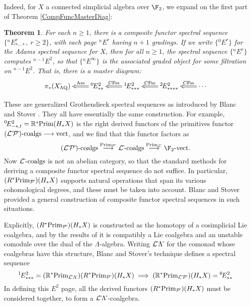 \documentclass[11pt]{article}
\theoremstyle{plain}
\newtheorem{theorem}{Theorem}
\renewcommand*{\thetheorem}{\Alph{theorem}}
\begin{document}
Indeed, for $X$ a connected simplicial algebra over $\F_2$, we expand on the first part of Theorem \ref{CompFuncMasterDiag}:
{
\renewcommand{\thetheorem}{\ref{CompFuncMasterDiag}.A}
\begin{theorem}
For each $n\geq1$, there is a composite functor spectral sequence $\{{^{n\!}}E^r_{*\cdots *},\ r\geq2\}$, with each page ${^{n\!}}E^r$ having $n+1$ gradings. If we write $\{{^{0\!}}E^r\}$ for the Adams spectral sequence for $X$, then for all $n\geq1$, the spectral sequence $\{{^{n\!}}E^r\}$ computes ${^{n-1\!}}E^2$, so that $\{{^{n\!}}E^\infty\}$ is the associated graded object for some filtration on ${^{n-1\!}}E^2$. That is, there is a master diagram:
\[\xymatrix@R=4mm{
\pi_{*}(X{\hat{\,}_\textup{\!\!AQ}})&%
\ar@{=>}[l]_-{\textup{Ass}}
{^{0\!}}E^2_{**}&%
\ar@{=>}[l]_-{\textup{CFss}}
{^{1\!}}E^2_{***}
&%
{^{2\!}}E^2_{****}
\ar@{=>}[l]_-{\textup{CFss}}&%
\cdots
\ar@{=>}[l]_-{\textup{CFss}}%
}\]
\end{theorem}
}
\noindent These are generalized Grothendieck spectral sequences as introduced by Blanc and Stover \cite{Blanc_Stover-Groth_SS.pdf}. They all have essentially the same construction. For example, ${^{0\!}}E^2_{-s,t}=\mathbb{R}^s\textup{Prim}(H_*X)$ is the right derived functors of the primitives functor $(\mathcal{L}{\hat{\,}}\mathcal{P}{\hat{\,}})\textup{-coalgs}\longrightarrow \textup{vect}$, and we find that this functor factors as
\[(\calL{\hat{\,}}\calP{\hat{\,}})\textup{-coalgs}\overset{\textup{Prim}_{\calP{\hat{\,}}}}{\to}
\calL{\hat{\,}}\textup{-coalgs}\overset{\textup{Prim}_{\calL{\hat{\,}}}}{\to}
 \F_2\textup{-vect}.\]
Now $\mathcal{L}{\hat{\,}}\textup{-coalgs}$ is not an abelian category, so that the standard methods for deriving a composite functor spectral sequence do not suffice. In particular, $(R^*\textup{Prim}_{\mathcal{P}{\hat{\,}}})(H_*X)$ supports natural operations that span its various cohomological degrees, and these must be taken into account. Blanc and Stover provided a general construction of composite functor spectral sequences in such situations.

Explicitly, $(R^*\textup{Prim}_{\mathcal{P}{\hat{\,}}})(H_*X)$ is constructed as the homotopy of a cosimplicial Lie coalgebra, and by the results of \cite{6Author.pdf} it is compatibly a Lie coalgebra and an unstable comodule over the dual of the $\Lambda$-algebra. Writing $\mathcal{L}{\hat{\,}}\Lambda{\hat{\,}}$ for the comonad whose coalgebras have this structure, Blanc and Stover's technique defines a spectral sequence \[{^{1\!}}E^2_{***}= (\mathbb{R}^* \textup{Prim}_{\mathcal{L}{\hat{\,}}\Lambda{\hat{\,}}})(R^*\textup{Prim}_{\mathcal{P}{\hat{\,}}})(H_*X) \implies (\mathbb{R}^* \textup{Prim}_{\mathcal{L}{\hat{\,}}\mathcal{P}{\hat{\,}}})(H_*X)={^{0\!}}E^2_{**}\]
In defining this $E^2$ page, all the derived functors $(R^*\textup{Prim}_{\mathcal{P}{\hat{\,}}})(H_*X)$ must be considered together, to form a $\mathcal{L}{\hat{\,}}\Lambda{\hat{\,}}$-coalgebra.
\end{document}
